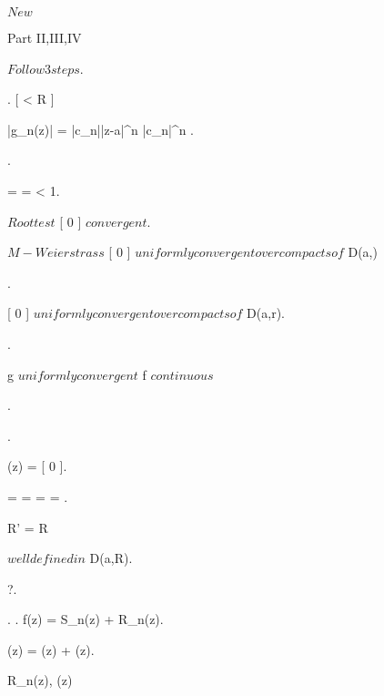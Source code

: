 \documentclass[../Main/main]{subfiles}
\begin{document}
\unit{ $ New $ }
{

	
	{
		{
			
		}
		\holds
		{
			Part II,III,IV
		}
		\demonstration
		{
			$ Follow 3 steps $.
			
			{
				.
				\all{ \rho \in \R }[ \rho < R ]
				{
					\all{ z \in \closed{D(a,\rho)} }
					{
						|g_n(z)| = |c_n||z-a|^n \leq |c_n|\rho^n
					}.

					.

					 = \rho {} =  < 1.

					$Root test$ \imp {}[ 0 ] $ convergent $.

					$M-Weierstrass$ \imp {}[ 0 ] $ uniformly convergent over compacts of $ D(a,\rho)
				}.

				[ 0 ] $ uniformly convergent over compacts of $ D(a,r).

				.

				g $ uniformly convergent $ \imp f $ continuous $
			}.
			
			{
				.

				(z) = [ 0 ].

				 =  =  =  = .

				R' = R

			}

			{
				 $well defined in $ D(a,R).
				{
					
						 ?.

						{
							.
							.
							f(z) = S_n(z) + R_n(z).

							(z) = (z) + (z).

							R_n(z), (z) 

}}}}}}
\end{document}
